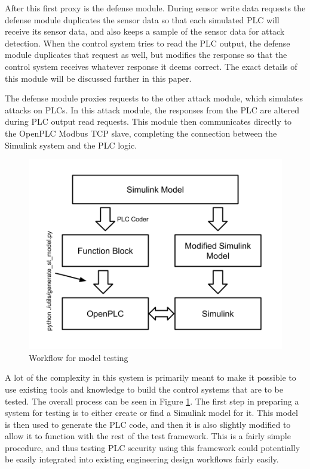 \documentclass[10pt,twocolumn]{IEEEtran}
\begin{document}
After this first proxy is the defense module.
During sensor write data requests the defense module duplicates the sensor data so that each simulated PLC will receive its sensor data, and also keeps a sample of the sensor data for attack detection.
When the control system tries to read the PLC output, the defense module duplicates that request as well, but modifies the response so that the control system receives whatever response it deems correct.
The exact details of this module will be discussed further in this paper.

The defense module proxies requests to the other attack module, which simulates attacks on PLCs.
In this attack module, the responses from the PLC are altered during PLC output read requests.
This module then communicates directly to the OpenPLC Modbus TCP slave, completing the connection between the Simulink system and the PLC logic.

\begin{figure}
  \centering
  \includegraphics[width=\columnwidth]{csaw2017workflow.png}
  \caption{Workflow for model testing}
  \label{fig:workflow}
\end{figure}

A lot of the complexity in this system is primarily meant to make it possible to use existing tools and knowledge to build the control systems that are to be tested.
The overall process can be seen in Figure \ref{fig:workflow}.
The first step in preparing a system for testing is to either create or find a Simulink model for it.
This model is then used to generate the PLC code, and then it is also slightly modified to allow it to function with the rest of the test framework.
This is a fairly simple procedure, and thus testing PLC security using this framework could potentially be easily integrated into existing engineering design workflows fairly easily.
\end{document}
